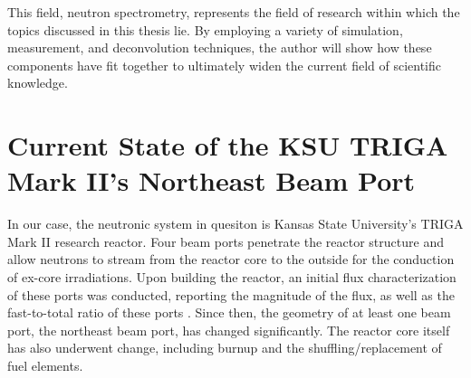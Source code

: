 This field, neutron spectrometry, represents the field of research within which the topics discussed in this thesis lie.
By employing a variety of simulation, measurement, and deconvolution techniques, the author will show how these components have fit together to ultimately widen the current field of scientific knowledge.



\section{Current State of the KSU TRIGA Mark II's Northeast Beam Port}
In our case, the neutronic system in quesiton is Kansas State University's TRIGA Mark II research reactor.
Four beam ports penetrate the reactor structure and allow neutrons to stream from the reactor core to the outside for the conduction of ex-core irradiations.
Upon building the reactor, an initial flux characterization of these ports was conducted, reporting the magnitude of the flux, as well as the fast-to-total ratio of these ports \cite{bouchey1967experimental}.
Since then, the geometry of at least one beam port, the northeast beam port, has changed significantly.
The reactor core itself has also underwent change, including burnup and the shuffling/replacement of fuel elements.

